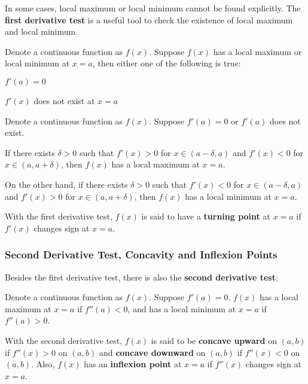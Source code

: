 \documentclass[a4paper,12pt]{article}
\begin{document}
In some cases, local maximum or local minimum cannot be found explicitly. The \textbf{first derivative test} is a useful tool to check the existence of local maximum and local minimum.\n

\begin{thm}
  Denote a continuous function as $f(x)$. Suppose $f(x)$ has a local maximum or local minimum at $x=a$, then either one of the following is true:

  \begin{alist}
    \item $f'(a)=0$
    \item $f'(x)$ does not exist at $x=a$
  \end{alist}
\end{thm}\n

\begin{thm}
  Denote a continuous function as $f(x)$. Suppose $f'(a)=0$ or $f'(a)$ does not exist.\n

   If there exists $\delta>0$ such that $f'(x)>0$ for $x\in(a-\delta,a)$ and $f'(x)<0$ for $x\in(a,a+\delta)$, then $f(x)$ has a local maximum at $x=a$.\n

   On the other hand, if there exists $\delta>0$ such that $f'(x)<0$ for $x\in(a-\delta,a)$ and $f'(x)>0$ for $x\in(a,a+\delta)$, then $f(x)$ has a local minimum at $x=a$.
\end{thm}\n

\begin{dft}
  With the first derivative test, $f(x)$ is said to have a \textbf{turning point} at $x=a$ if $f'(x)$ changes sign at $x=a$.
\end{dft}

\subsubsection{Second Derivative Test, Concavity and Inflexion Points}
Besides the first derivative test, there is also the \textbf{second derivative test}:\n

\begin{thm}
  Denote a continuous function as $f(x)$. Suppose $f'(a)=0$. $f(x)$ has a local maximum at $x=a$ if $f''(a)<0$, and has a local minimum at $x=a$ if $f''(a)>0$.
\end{thm}\n

\begin{dft}
  With the second derivative test, $f(x)$ is said to be \textbf{concave upward} on $(a,b)$ if $f''(x)>0$ on $(a,b)$ and \textbf{concave downward} on $(a,b)$ if $f''(x)<0$ on $(a,b)$. Also, $f(x)$ has an \textbf{inflexion point} at $x=a$ if $f''(x)$ changes sign at $x=a$.
\end{dft}
\end{document}
